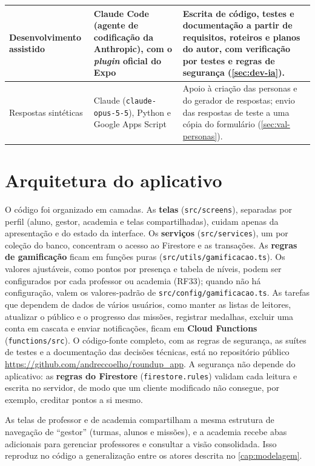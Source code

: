 \begin{quadrolongo}
\begin{longtable}{|p{3.2cm}|p{4.0cm}|p{6.0cm}|}
    Desenvolvimento assistido & Claude Code (agente de codificação da Anthropic), com o \textit{plugin} oficial do Expo & Escrita de código, testes e documentação a partir de requisitos, roteiros e planos do autor, com verificação por testes e regras de segurança (\autoref{sec:dev-ia}). \\ \hline
    Respostas sintéticas & Claude (\texttt{claude-opus-5-5}), Python e Google Apps Script & Apoio à criação das personas e do gerador de respostas; envio das respostas de teste a uma cópia do formulário (\autoref{sec:val-personas}). \\ \hline
\end{longtable}
\end{quadrolongo}

\section{Arquitetura do aplicativo}

O código foi organizado em camadas. As \textbf{telas}
(\texttt{src/screens}), separadas por perfil (aluno, gestor, academia e
telas compartilhadas), cuidam apenas da apresentação e do estado da
interface. Os \textbf{serviços} (\texttt{src/services}), um por coleção do
banco, concentram o acesso ao Firestore e as transações. As
\textbf{regras de gamificação} ficam em funções puras
(\texttt{src/utils/gamificacao.ts}). Os valores ajustáveis, como pontos
por presença e tabela de níveis, podem ser configurados por cada professor
ou academia (RF33); quando não há configuração, valem os valores-padrão
de \texttt{src/config/gamificacao.ts}. As tarefas que dependem de dados de
vários usuários, como manter as listas de leitores, atualizar o público e o
progresso das missões, registrar medalhas, excluir uma conta em cascata e
enviar notificações, ficam em
\textbf{Cloud Functions} (\texttt{functions/src}). O código-fonte
completo, com as regras de segurança, as suítes de testes e a
documentação das decisões técnicas, está no repositório público
\url{https://github.com/andreccoelho/roundup_app}. A segurança não depende do
aplicativo: as \textbf{regras do Firestore} (\texttt{firestore.rules})
validam cada leitura e escrita no servidor, de modo que um cliente
modificado não consegue, por exemplo, creditar pontos a si mesmo.

As telas de professor e de academia compartilham a mesma estrutura de
navegação de ``gestor'' (turmas, alunos e missões), e a academia recebe
abas adicionais para gerenciar professores e consultar a visão
consolidada. Isso reproduz no código a generalização entre os atores
descrita no \autoref{cap:modelagem}.

